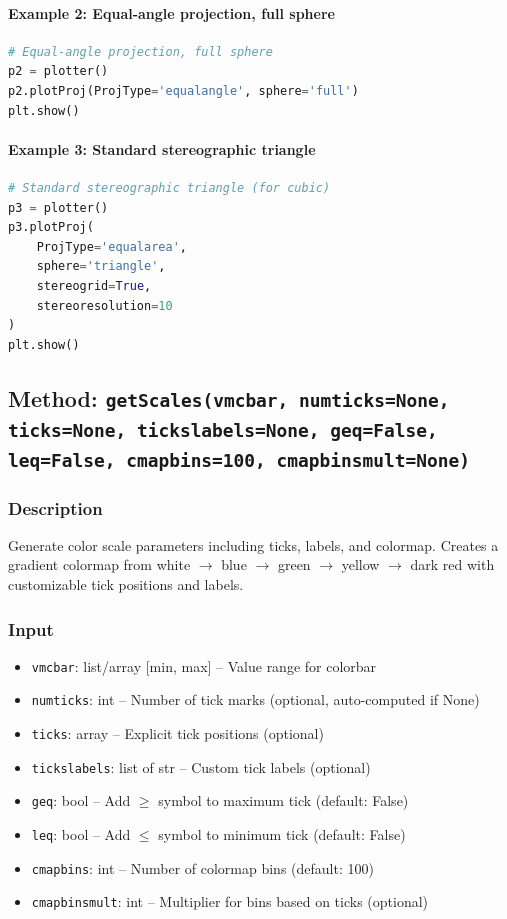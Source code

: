 \documentclass[11pt,a4paper]{article}
\begin{document}
\paragraph{Example 2: Equal-angle projection, full sphere}
\begin{lstlisting}[language=Python, caption=Equal-angle full sphere projection]
# Equal-angle projection, full sphere
p2 = plotter()
p2.plotProj(ProjType='equalangle', sphere='full')
plt.show()
\end{lstlisting}

\paragraph{Example 3: Standard stereographic triangle}
\begin{lstlisting}[language=Python, caption=Stereographic triangle for cubic systems]
# Standard stereographic triangle (for cubic)
p3 = plotter()
p3.plotProj(
    ProjType='equalarea',
    sphere='triangle',
    stereogrid=True,
    stereoresolution=10
)
plt.show()
\end{lstlisting}

\subsection{Method: \texttt{getScales(vmcbar, numticks=None, ticks=None, tickslabels=None, geq=False, leq=False, cmapbins=100, cmapbinsmult=None)}}

\subsubsection{Description}
Generate color scale parameters including ticks, labels, and colormap. Creates a gradient colormap from white $\rightarrow$ blue $\rightarrow$ green $\rightarrow$ yellow $\rightarrow$ dark red with customizable tick positions and labels.

\subsubsection{Input}
\begin{itemize}[leftmargin=*]
    \item \texttt{vmcbar}: list/array [min, max] -- Value range for colorbar
    \item \texttt{numticks}: int -- Number of tick marks (optional, auto-computed if None)
    \item \texttt{ticks}: array -- Explicit tick positions (optional)
    \item \texttt{tickslabels}: list of str -- Custom tick labels (optional)
    \item \texttt{geq}: bool -- Add $\geq$ symbol to maximum tick (default: False)
    \item \texttt{leq}: bool -- Add $\leq$ symbol to minimum tick (default: False)
    \item \texttt{cmapbins}: int -- Number of colormap bins (default: 100)
    \item \texttt{cmapbinsmult}: int -- Multiplier for bins based on ticks (optional)
\end{itemize}
\end{document}

